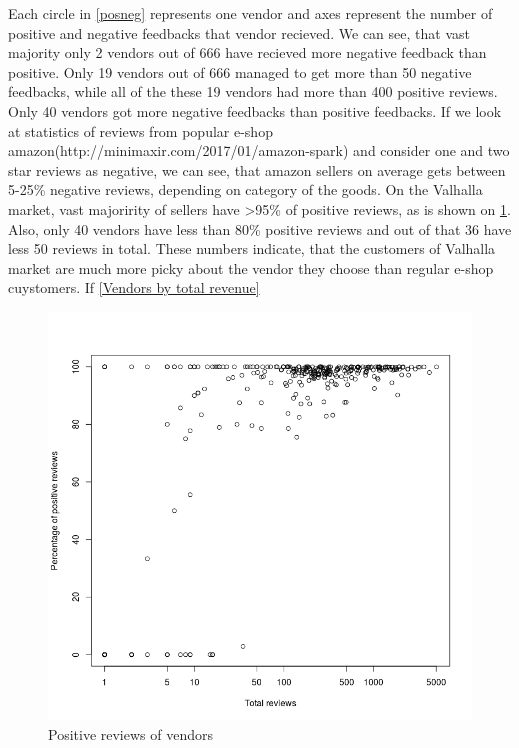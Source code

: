 \documentclass[
  digital, %
  table,   %
  lof,     %
  lot,     %
  oneside
]{fithesis3}
\begin{document}
Each circle in \ref{posneg} represents one vendor and axes represent
the number of positive and negative feedbacks that vendor recieved. 
We can see, that vast majority only 2 vendors out of 666 have recieved more negative feedback than positive.
Only 19 vendors out of 666 managed to get more than 50 negative feedbacks, while all of the these 19 vendors had more
 than 400 positive reviews.
Only 40 vendors got more negative feedbacks than positive feedbacks.
 If we look at statistics of reviews from popular e-shop amazon(http://minimaxir.com/2017/01/amazon-spark)
  and consider one and two star reviews as negative, we can see, that amazon sellers on
  average gets between 5-25\% negative reviews, depending on category of the goods.
  On the Valhalla market, vast majoririty of sellers have >95\% of positive reviews, as is shown on \ref{pospercent}.
  Also, only 40 vendors have less than 80\% positive reviews and out of that 36 have less 50 reviews in total.
  These numbers indicate, that the customers of Valhalla market are much more picky about the vendor they choose than regular e-shop cuystomers. If \ref{Vendors by total revenue}
  

\begin{figure}[!htb]
    \centering
    \includegraphics[scale=0.4]{pospercent}
    \caption{Positive reviews of vendors}
    \label{pospercent}
\end{figure}
\end{document}
